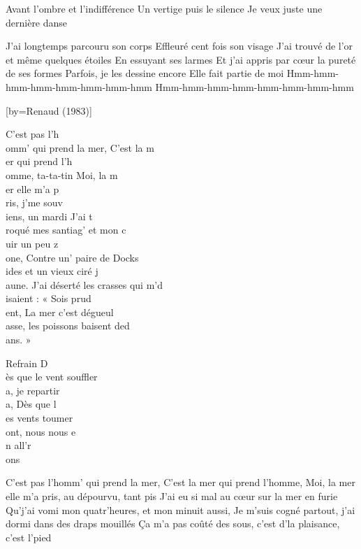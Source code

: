 \beginverse
Avant l'ombre et l'indifférence
Un vertige puis le silence
Je veux juste une dernière danse
\endverse

\beginverse
J'ai longtemps parcouru son corps
Effleuré cent fois son visage
J'ai trouvé de l'or et même quelques étoiles
En essuyant ses larmes
Et j'ai appris par cœur la pureté de ses formes
Parfois, je les dessine encore
Elle fait partie de moi
Hmm-hmm-hmm-hmm-hmm-hmm-hmm-hmm
Hmm-hmm-hmm-hmm-hmm-hmm-hmm-hmm
\endverse

[by={Renaud (1983)}]

\beginverse
C'est pas l'h\\[Mim]omm' qui prend la mer,
C'est la m\\[Ré]er qui prend l'h\\[Mi]omme, ta-ta-tin
Moi, la m\\[Mim]er elle m'a p\\[Ré]ris, j'me souv\\[Mim]iens, un mardi
J'ai t\\[Mim]roqué mes santiag' et mon c\\[Ré]uir un peu z\\[Mim]one,
Contre un' paire de Docks\\[Ré]ides et un vieux ciré j\\[Mim]aune.
J'ai déserté les crasses qui m'd\\[Ré]isaient : « Sois prud\\[Mim]ent,
La mer c'est dégueul\\[Ré]asse, les poissons baisent ded\\[Mi]ans. »
\endverse

\beginverse
Refrain
D\\[Mi]ès que le vent souffler\\[Ré]a, je repartir\\[Mim]a,
Dès que l\\[Sol]es vents toumer\\[Ré]ont, nous nous e\\[Si7]n all'r\\[Mim]ons
\endverse

\beginverse
C'est pas l'homm' qui prend la mer, 
C'est la mer qui prend l’homme,
Moi, la mer elle m'a pris, au dépourvu, tant pis \!
J'ai eu si mal au cœur sur la mer en furie
Qu'j'ai vomi mon quatr'heures, et mon minuit aussi,
Je m'suis cogné partout, j'ai dormi dans des draps mouillés
Ça m'a pas coûté des sous, c'est d'la plaisance, c'est l'pied \!
\endverse

